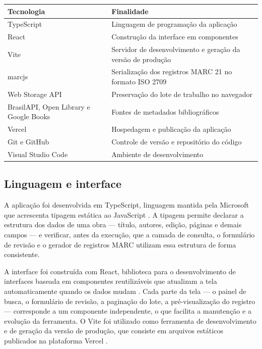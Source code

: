 \begin{quadro}[htb]
    \centering
    \caption{Tecnologias e ferramentas utilizadas no desenvolvimento}
    \label{qua:tecnologias}
    \begin{tabular}{|p{}|p{}|}
        \hline
        \textbf{Tecnologia} & \textbf{Finalidade} \\ \hline
        TypeScript & Linguagem de programação da aplicação \\ \hline
        React & Construção da interface em componentes \\ \hline
        Vite & Servidor de desenvolvimento e geração da versão de produção \\ \hline
        marcjs & Serialização dos registros MARC 21 no formato ISO 2709 \\ \hline
        Web Storage API & Preservação do lote de trabalho no navegador \\ \hline
        BrasilAPI, Open Library e Google Books & Fontes de metadados bibliográficos \\ \hline
        Vercel & Hospedagem e publicação da aplicação \\ \hline
        Git e GitHub & Controle de versão e repositório do código \\ \hline
        Visual Studio Code & Ambiente de desenvolvimento \\ \hline
    \end{tabular}
\end{quadro}

\subsection{Linguagem e interface}
\label{subsec:react}

A aplicação foi desenvolvida em TypeScript, linguagem mantida pela Microsoft que acrescenta tipagem estática ao JavaScript \cite{typescript}. A tipagem permite declarar a estrutura dos dados de uma obra --- título, autores, edição, páginas e demais campos --- e verificar, antes da execução, que a camada de consulta, o formulário de revisão e o gerador de registros MARC utilizam essa estrutura de forma consistente.

A interface foi construída com React, biblioteca para o desenvolvimento de interfaces baseada em componentes reutilizáveis que atualizam a tela automaticamente quando os dados mudam \cite{react}. Cada parte da tela --- o painel de busca, o formulário de revisão, a paginação do lote, a pré-visualização do registro --- corresponde a um componente independente, o que facilita a manutenção e a evolução da ferramenta. O Vite foi utilizado como ferramenta de desenvolvimento e de geração da versão de produção, que consiste em arquivos estáticos publicados na plataforma Vercel \cite{vite}.

